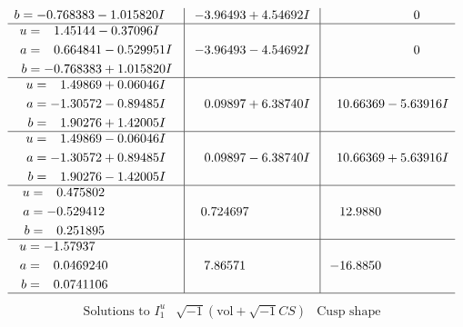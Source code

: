 \documentclass[1p]{elsarticle_modified}
\theoremstyle{definition}
\newcommand{\I}{\sqrt{-1}}
\begin{document}
$$\begin{array}{c|c|c}
\begin{aligned}
b &= -0.768383 - 1.015820 I\end{aligned}
 & -3.96493 + 4.54692 I & \phantom{-0.000000 } 0 \\ \hline\begin{aligned}
u &= \phantom{-}1.45144 - 0.37096 I \\
a &= \phantom{-}0.664841 - 0.529951 I \\
b &= -0.768383 + 1.015820 I\end{aligned}
 & -3.96493 - 4.54692 I & \phantom{-0.000000 } 0 \\ \hline\begin{aligned}
u &= \phantom{-}1.49869 + 0.06046 I \\
a &= -1.30572 - 0.89485 I \\
b &= \phantom{-}1.90276 + 1.42005 I\end{aligned}
 & \phantom{-}0.09897 + 6.38740 I & \phantom{-}10.66369 - 5.63916 I \\ \hline\begin{aligned}
u &= \phantom{-}1.49869 - 0.06046 I \\
a &= -1.30572 + 0.89485 I \\
b &= \phantom{-}1.90276 - 1.42005 I\end{aligned}
 & \phantom{-}0.09897 - 6.38740 I & \phantom{-}10.66369 + 5.63916 I \\ \hline\begin{aligned}
u &= \phantom{-}0.475802\phantom{ +0.000000I} \\
a &= -0.529412\phantom{ +0.000000I} \\
b &= \phantom{-}0.251895\phantom{ +0.000000I}\end{aligned}
 & \phantom{-}0.724697\phantom{ +0.000000I} & \phantom{-}12.9880\phantom{ +0.000000I} \\ \hline\begin{aligned}
u &= -1.57937\phantom{ +0.000000I} \\
a &= \phantom{-}0.0469240\phantom{ +0.000000I} \\
b &= \phantom{-}0.0741106\phantom{ +0.000000I}\end{aligned}
 & \phantom{-}7.86571\phantom{ +0.000000I} & -16.8850\phantom{ +0.000000I}\\
 \hline 
 \end{array}$$\newpage$$\begin{array}{c|c|c}  
\text{Solutions to }I^u_{1}& \I (\text{vol} + \sqrt{-1}CS) & \text{Cusp shape}\\
 \hline 
\begin{aligned}

\end{aligned}
\end{array}$$
\end{document}
